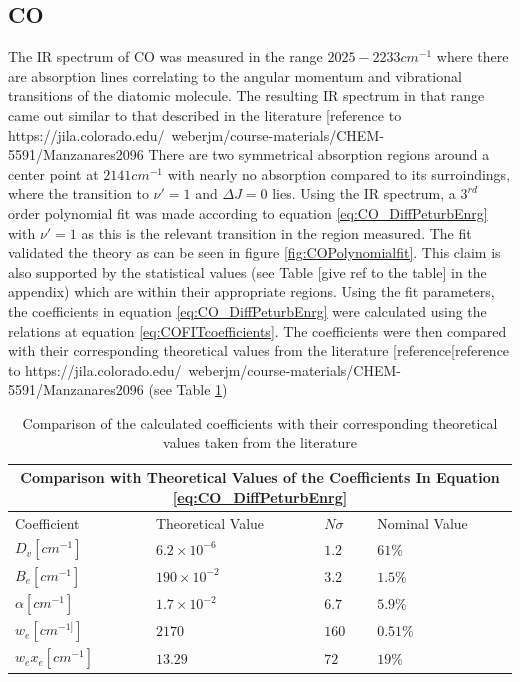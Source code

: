 \documentclass[reprint,amsmath,amssymb,aps, prl]{revtex4-2}
\begin{document}
\subsection{CO}
The IR spectrum of CO was measured in the range $2025-2233 cm^{-1}$ where there are absorption lines correlating to the angular momentum and vibrational transitions of the diatomic molecule. The resulting IR spectrum in that range came out similar to that described in the literature [reference to https://jila.colorado.edu/~weberjm/course-materials/CHEM-5591/Manzanares2096%
There are two symmetrical absorption regions around a center point at $2141cm^{-1}$ with nearly no absorption compared to its surroindings, where the transition to $\nu'=1$ and $\Delta J=0$ lies. Using the IR spectrum, a $3^{rd}$ order polynomial fit was made according to equation \ref{eq:CO_DiffPeturbEnrg} with $\nu'=1$ as this is the relevant transition in the region measured. The fit validated the theory as can be seen in figure \ref{fig:COPolynomialfit}. This claim is also supported by the statistical values (see Table [give ref to the table] in the appendix) which are within their appropriate regions. Using the fit parameters, the coefficients in equation \ref{eq:CO_DiffPeturbEnrg} were calculated using the relations at equation \ref{eq:COFITcoefficients}. The coefficients were then compared with their corresponding theoretical values from the literature [reference[reference to https://jila.colorado.edu/~weberjm/course-materials/CHEM-5591/Manzanares2096%
(see Table \ref{tbl:COTheoreticalValues})
\begin{table}[h]
    \begin{tabular}{ |p{2.3cm}|p{3cm}|p{2.3cm}|p{3cm}|  }
     \hline
     \multicolumn{4}{|c|}{Comparison with Theoretical Values of the Coefficients In Equation \ref{eq:CO_DiffPeturbEnrg}} \\ \hline
     Coefficient & Theoretical Value & $N\sigma$ & Nominal Value \\ \hline
     $D_{v}[cm^{-1}]$ & $6.2\times{10^{-6}}$ & $1.2$ & $61$\% \\ \hline
     $B_{e}[cm^{-1}]$ & $190\times{10^{-2}}$ & $3.2$ & $1.5$\%\\ \hline
     $\alpha[cm^{-1}]$ & $1.7\times{10^{-2}}$ & $6.7$ & $5.9$\%\\ \hline
     $w_{e}[cm^{-1]}]$ & $2170$ & $160$ & $0.51$\%\\ \hline
     $w_{e}x_{e}[cm^{-1}]$ & $13.29$ & $72$ & $19$\% \\ \hline
    \end{tabular}
    \caption{Comparison of the calculated coefficients with their corresponding theoretical values taken from the literature}
    \label{tbl:COTheoreticalValues}
\end{table}
\end{document}
